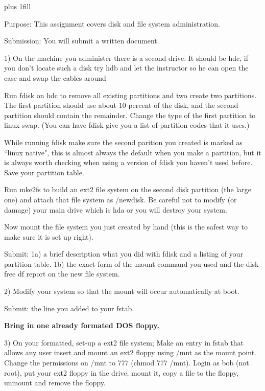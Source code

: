 
\rightskip=0pt plus 1fill

\parindent 0pt

Purpose: This assignment covers disk and file system administration.

Submission: You will submit a written document.

1) On the machine you administer there is a second drive.
It should be {\ltt{}hdc}, if you don't locate such a disk
try {\ltt{}hdb} and let the instructor so he can
open the case and swap the cables around

Run {\ltt{}fdisk} on {\ltt{}hdc} to remove all existing partitions and
two create two partitions.
The first partition should use about 10 percent of the
disk, and the second partition should contain the remainder.
Change the type of the first partition to linux swap.
(You can have {\ltt{}fdisk} give you a list of partition codes that it uses.)

While running {\ltt{}fdisk} make sure the second parition
you created is marked as ``linux native", this is almost always the
default when you make a partition, but it is always worth checking
when using a version of {\ltt{}fdisk} you haven't used before.
Save your partition table.

Run {\ltt{}mke2fs} to build 
an ext2 file system on the second disk partition (the large
one) and attach that file system as {\ltt{}/newdisk}.
Be careful not to modify (or damage) your main drive
which is {\ltt{}hda} or you will destroy your system.

Now mount the file system you just created by hand
(this is the safest way to make sure it is set up right).

Submit: 
1a) a brief description what you did with {\ltt{}fdisk} and
a listing of your partition table.
1b) the exact form of the {\ltt{}mount} command you used and
the disk free {\ltt{}df} report on the new file system.

2) Modify your system so that the mount will 
occur automatically at boot.

Submit: the line you added to your {\ltt{}fstab}.

{\bf Bring in one already formated DOS floppy.}

3) On your formatted, set-up a ext2 file system;
Make an entry in {\ltt{}fstab} that allows any user insert and 
mount an ext2 floppy using {\ltt{}/mnt} as the mount point.
Change the permissions on {\ltt{}/mnt} to 777 ({\ltt{}chmod 777 /mnt}).
Login as bob (not root), put your ext2 floppy
in the drive,
mount it, copy a file to the floppy, unmount and remove the floppy.

